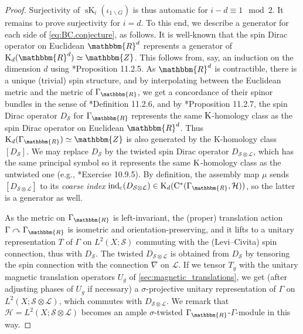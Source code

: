\documentclass{amsart}
\numberwithin{figure}{section}
\numberwithin{equation}{section}
\numberwithin{table}{section}
\theoremstyle{plain}
\theoremstyle{definition}
\theoremstyle{remark}
\theoremstyle{nonumber}
\newcommand{\Z}{\mathbb{Z}}
\newcommand{\R}{\mathbb{R}}
\newcommand{\K}{\relax\ifmmode\operatorname{K}\else\textup{K}\fi}
\newcommand{\sK}{\operatorname{sK}}
\newcommand{\Cst}{\relax\ifmmode\mathrm{C}^*\else\textup{C*}\fi}
\newcommand{\ind}{\operatorname{ind}} %
\renewcommand{\mathbb}{\mathbbm} %
\begin{document}
\begin{proof}
Surjectivity of \( \sK_{i}(\iota_{1\backslash G}) \) is thus automatic for
\( i-d\equiv 1\mod 2 \). It remains to prove surjectivity for \( i=d \). To
this end, we describe a generator for each side of
\eqref{eq:BC.conjecture}, as follows. It is well-known that the spin Dirac
operator on Euclidean $\R^d$ represents a generator of
$\K_d(\R^d)\simeq\Z$.  This follows from, say, an induction on the
dimension \( d \) using \cite{Higson-Roe:Analytic_K-homology}*{Proposition
11.2.5}.  As $\R^d$ is contractible, there is a unique (trivial) spin
structure, and by interpolating between the Euclidean metric and the metric
of \( \Gamma_\R \), we get a concordance of their spinor bundles in the
sense of \cite{Higson-Roe:Analytic_K-homology}*{Definition 11.2.6}, and by
\cite{Higson-Roe:Analytic_K-homology}*{Proposition 11.2.7}, the spin Dirac
operator $D_\mathcal{S}$ for $\Gamma_\R$ represents the same $\K$-homology
class as the spin Dirac operator on Euclidean $\R^d$. Thus \(
\K_d(\Gamma_\R)\simeq\Z \) is also generated by the K-homology class \(
[D_\mathcal{S}] \).  We may replace $D_\mathcal{S}$ by the twisted spin
Dirac operator $D_{\mathcal{S}\otimes\mathcal{L}}$, which has the same
principal symbol so it represents the same $\K$-homology class as the
untwisted one (e.g., \cite{Higson-Roe:Analytic_K-homology}*{Exercise
10.9.5}). By definition, the assembly map \( \mu \) sends
$[D_{\mathcal{S}\otimes\mathcal{L}}]$ to its \emph{coarse index} \(
\ind_\mathrm{c}(D_{\mathcal{S}\otimes\mathcal{L}})
\in\K_d(\Cst(\Gamma_\R,\mathcal{H})) \), so the latter is a generator
as well. 

As the metric on $\Gamma_\R$ is left-invariant, the (proper) translation action $\Gamma\curvearrowright \Gamma_\R$ is isometric and orientation-preserving, and it lifts to a unitary representation $T$ of $\Gamma$ on
$L^2(X;\mathcal{S})$ commuting with the (Levi--Civita) spin connection, thus with $D_\mathcal{S}$. The twisted $D_{\mathcal{S}\otimes\mathcal{L}}$ is obtained from $D_\mathcal{S}$ by tensoring the spin connection with the connection $\nabla$ on $\mathcal{L}$. If we tensor $T_g$ with the unitary magnetic translation operators $U_g$ of \cref{sec:magnetic_translations}, we get (after adjusting phases of $U_g$ if necessary) a $\sigma$-projective unitary representation of $\Gamma$ on $L^2(X;\mathcal{S}\otimes\mathcal{L})$, which commutes with $D_{\mathcal{S}\otimes\mathcal{L}}$. We remark that $\mathcal{H}=L^2(X;\mathcal{S}\otimes\mathcal{L})$ becomes an ample $\sigma$-twisted $\Gamma_\R$-$\Gamma$-module in this way.


\end{proof}
\end{document}
